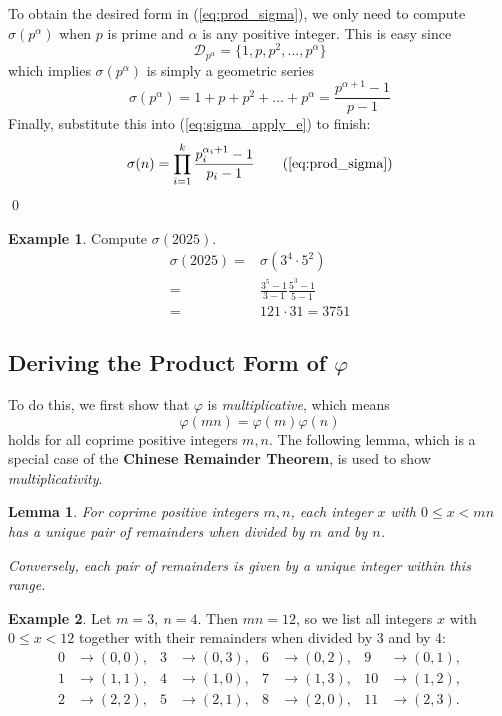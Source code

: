 \documentclass[a4paper, 12pt]{article}
\newtheorem{lemma}{Lemma}
\theoremstyle{definition}
\newtheorem{example}{Example}
\begin{document}
To obtain the desired form in (\ref{eq:prod_sigma}), we only need to compute $\sigma(p^\alpha)$ when $p$ is prime and $\alpha$ is any positive integer.
This is easy since
\begin{equation}
  \mathcal{D}_{p^\alpha}=\{1, p, p^2, \dots, p^\alpha\}
\end{equation}
which implies $\sigma(p^\alpha)$ is simply a geometric series
\begin{equation}
  \sigma(p^{\alpha})=1+p+p^2+\dots+p^\alpha = \frac{p^{\alpha+1}-1}{p-1}
\end{equation}
Finally, substitute this into (\ref{eq:sigma_apply_e}) to finish:
\[
  \sigma(n) = \prod_{i=1}^{k} \frac{p_i^{\alpha_i+1}-1}{p_i-1} \tag{\ref{eq:prod_sigma}}
\]
\qed\vspace{1em}

\begin{example}\label{ex:sigma_2025}
  Compute $\sigma(2025)$.
  \begin{align*}
    \sigma(2025) = &\sigma(3^4\cdot 5^2)\\
    = &\frac{3^5-1}{3-1} \frac{5^3-1}{5-1}\\
    = &121 \cdot 31 = 3751
  \end{align*}
\end{example}

\subsection{Deriving the Product Form of $\varphi$}
To do this, we first show that $\varphi$ is \textit{multiplicative}, which means
\begin{equation}
  \varphi(mn)=\varphi(m)\varphi(n)
\end{equation}
holds for all coprime positive integers $m, n$.
The following lemma, which is a special case of the \textbf{Chinese Remainder Theorem}, is used to show \textit{multiplicativity}.

\vspace{1em}\begin{lemma}\label{lemma:totientl1}
  For coprime positive integers $m, n$, each integer $x$ with $0\leq x < mn$
  has a unique pair of remainders when divided by $m$ and by $n$.

  Conversely, each pair of remainders is given by a unique integer within this range.
\end{lemma}
\vspace{1em}
\begin{example}\label{ex:remainder_12}
  Let $m=3,\ n=4$.
  Then $mn=12$, so we list all integers
  $x$ with $0 \leq x < 12$ together with their remainders
  when divided by 3 and by 4:
  \[
  \begin{aligned}
    0 &\rightarrow (0,0), & 3 &\rightarrow (0,3), & 6 &\rightarrow (0,2), & 9  &\rightarrow (0,1),\\
    1 &\rightarrow (1,1), & 4 &\rightarrow (1,0), & 7 &\rightarrow (1,3), & 10 &\rightarrow (1,2),\\
    2 &\rightarrow (2,2), & 5 &\rightarrow (2,1), & 8 &\rightarrow (2,0), & 11 &\rightarrow (2,3).
  \end{aligned}
  \]
\end{example}\vspace{1em}
\end{document}
